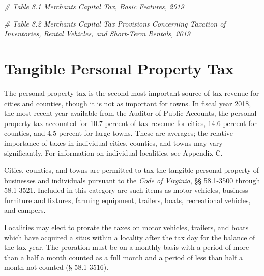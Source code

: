 \documentclass[
]{book}
\newenvironment{Shaded}{\begin{snugshade}}{\end{snugshade}}
\newcommand{\CommentTok}[1]{\textcolor[rgb]{0.56,0.35,0.01}{\textit{#1}}}
\begin{document}
\begin{Shaded}
\begin{Highlighting}[]
\CommentTok{\# Table 8.1 Merchants\textquotesingle{} Capital Tax, Basic Features, 2019}

\CommentTok{\# Table 8.2 Merchants\textquotesingle{} Capital Tax Provisions Concerning Taxation of Inventories, Rental Vehicles, and Short{-}Term Rentals, 2019}
\end{Highlighting}
\end{Shaded}

\hypertarget{tangible-personal-property-tax}{%
\chapter{Tangible Personal Property Tax}\label{tangible-personal-property-tax}}

The personal property tax is the second most important source of tax revenue for cities and counties, though it is not as important for towns. In fiscal year 2018, the most recent year available from the Auditor of Public Accounts, the personal property tax accounted for 10.7 percent of tax revenue for cities, 14.6 percent for counties, and 4.5 percent for large towns. These are averages; the relative importance of taxes in individual cities, counties, and towns may vary significantly. For information on individual localities, see Appendix C.

Cities, counties, and towns are permitted to tax the tangible personal property of businesses and individuals pursuant to the \emph{Code of Virginia}, §§ 58.1-3500 through 58.1-3521. Included in this category are such items as motor vehicles, business furniture and fixtures, farming equipment, trailers, boats, recreational vehicles, and campers.

Localities may elect to prorate the taxes on motor vehicles, trailers, and boats which have acquired a situs within a locality after the tax day for the balance of the tax year. The proration must be on a monthly basis with a period of more than a half a month counted as a full month and a period of less than half a month not counted (§ 58.1-3516).
\end{document}
